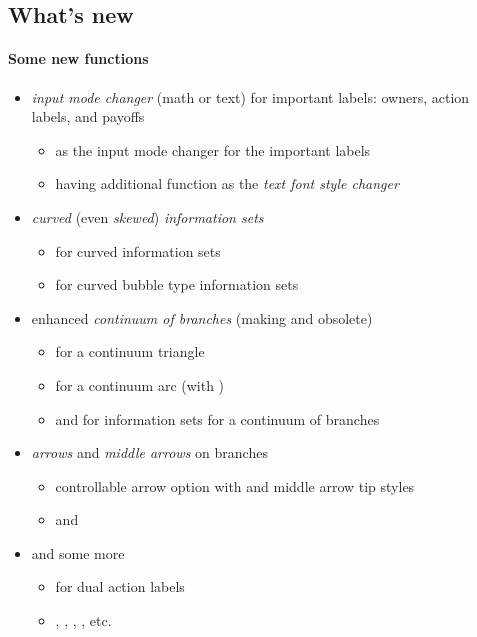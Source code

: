 \subsection{What's new}

\paragraph{Some new functions}

\begin{itemize}\tightlist
\item \emph{input mode changer} (math or text) for important labels: owners, action labels, and payoffs
  \begin{itemize}\tightlist
  \item \cmd{\setistmathTF} as the input mode changer for the important labels
  \item \cmd{\setistmathTF*} having additional function as the \emph{text font style changer}
  \end{itemize}
\item \emph{curved} (even \emph{skewed}) \emph{information sets}
  \begin{itemize}\tightlist
  \item \cmd{\xtCInfoset} for curved information sets
  \item \cmd{\xtCInfosetO} for curved bubble type information sets
  \end{itemize}
\item enhanced \emph{continuum of branches} (making \cmd{\istcntm} and \cmd{\istcntmarc} obsolete)
  \begin{itemize}\tightlist
  \item \cmd{\istrootcntm} for a continuum triangle
  \item \cmd{\istrootcntmA} for a continuum arc (with \cmd{\istbA})
  \item \cmd{\cntmAInfoset} and \cmd{\cmtmAInfosetO} for information sets for a continuum of branches
  \end{itemize}
\item \emph{arrows} and \emph{middle arrows} on branches
  \begin{itemize}\tightlist
  \item controllable arrow option \xw{->-} with \cmd{\setxtarrowtips} and middle arrow tip styles
  \item \cmd{\xtShowMidArrows} and \cmd{\xtShowArrows}
  \end{itemize}
\item and some more
  \begin{itemize}
  \item \cmd{\istB} for dual action labels
  \item \cmd{\xtTimeLineH}, \cmd{\xtTimeLineV}, \cmd{\xtCommentTo}, \cmd{\xtCommentFrom}, etc.
  \end{itemize}
\end{itemize}

